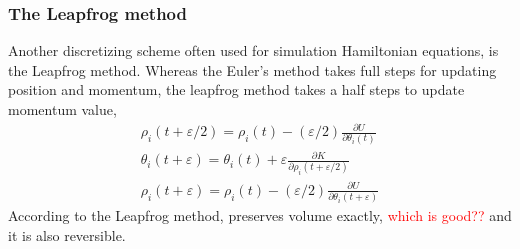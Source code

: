\subsubsection*{The Leapfrog method}
Another discretizing scheme often used for simulation Hamiltonian equations, is the Leapfrog method. Whereas the Euler’s method takes full steps for updating position and momentum, the leapfrog method takes a half steps to update momentum value,
\begin{equation*}
\begin{split}
\rho_{i}(t+\varepsilon / 2)=\rho_{i}(t)-(\varepsilon / 2) \frac{\partial U}{\partial \theta_{i}(t)} \\
\theta_{i}(t+\varepsilon)=\theta_{i}(t)+\varepsilon \frac{\partial K}{\partial \rho_{i}(t+\varepsilon / 2)} \\
\rho_{i}(t+\varepsilon)=\rho_{i}(t)-(\varepsilon / 2) \frac{\partial U}{\partial \theta_{i}(t+\varepsilon)}
\end{split}
\end{equation*}
According to \cite{neal2012mcmc} the Leapfrog method, preserves volume exactly, \textcolor{red}{which is good??} and it is also reversible. 

